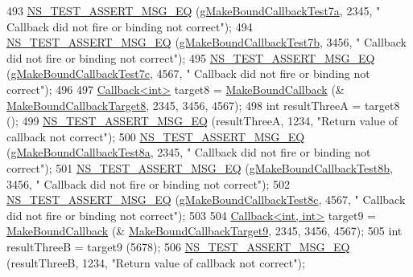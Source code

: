 \begin{DoxyCode}
493   \hyperlink{group__testing_ga2a9d78cffb3db8e867c35fff0b698cf5}{NS\_TEST\_ASSERT\_MSG\_EQ} (\hyperlink{callback-test-suite_8cc_a5e1517ba472cb373d210f6c4bf650774}{gMakeBoundCallbackTest7a}, 2345, \textcolor{stringliteral}{"
      Callback did not fire or binding not correct"});
494   \hyperlink{group__testing_ga2a9d78cffb3db8e867c35fff0b698cf5}{NS\_TEST\_ASSERT\_MSG\_EQ} (\hyperlink{callback-test-suite_8cc_a2fb964f8eaa6d045940c6b483930d1ed}{gMakeBoundCallbackTest7b}, 3456, \textcolor{stringliteral}{"
      Callback did not fire or binding not correct"});
495   \hyperlink{group__testing_ga2a9d78cffb3db8e867c35fff0b698cf5}{NS\_TEST\_ASSERT\_MSG\_EQ} (\hyperlink{callback-test-suite_8cc_a18bc2f4e64af63bb92d7ea129cee841f}{gMakeBoundCallbackTest7c}, 4567, \textcolor{stringliteral}{"
      Callback did not fire or binding not correct"});
496 
497   \hyperlink{classns3_1_1Callback}{Callback<int>} target8 = \hyperlink{group__makeboundcallback_ga1725d6362e6065faa0709f7c93f8d770}{MakeBoundCallback} (&
      \hyperlink{callback-test-suite_8cc_a3b2c793123d3f609d4e1eeee965dac5c}{MakeBoundCallbackTarget8}, 2345, 3456, 4567);
498   \textcolor{keywordtype}{int} resultThreeA = target8 ();
499   \hyperlink{group__testing_ga2a9d78cffb3db8e867c35fff0b698cf5}{NS\_TEST\_ASSERT\_MSG\_EQ} (resultThreeA, 1234, \textcolor{stringliteral}{"Return value of callback not correct"});
500   \hyperlink{group__testing_ga2a9d78cffb3db8e867c35fff0b698cf5}{NS\_TEST\_ASSERT\_MSG\_EQ} (\hyperlink{callback-test-suite_8cc_afa2dde26eb4eaba1ab619cca192e69b0}{gMakeBoundCallbackTest8a}, 2345, \textcolor{stringliteral}{"
      Callback did not fire or binding not correct"});
501   \hyperlink{group__testing_ga2a9d78cffb3db8e867c35fff0b698cf5}{NS\_TEST\_ASSERT\_MSG\_EQ} (\hyperlink{callback-test-suite_8cc_aa7b516443d299bb17a157ccff02e4f1e}{gMakeBoundCallbackTest8b}, 3456, \textcolor{stringliteral}{"
      Callback did not fire or binding not correct"});
502   \hyperlink{group__testing_ga2a9d78cffb3db8e867c35fff0b698cf5}{NS\_TEST\_ASSERT\_MSG\_EQ} (\hyperlink{callback-test-suite_8cc_ae36d0de967cac6dfce6c7cb5d82a0f34}{gMakeBoundCallbackTest8c}, 4567, \textcolor{stringliteral}{"
      Callback did not fire or binding not correct"});
503 
504   \hyperlink{classns3_1_1Callback}{Callback<int, int>} target9 = \hyperlink{group__makeboundcallback_ga1725d6362e6065faa0709f7c93f8d770}{MakeBoundCallback} (&
      \hyperlink{callback-test-suite_8cc_aac4d508c598787e6bd71ba6323d3b8f3}{MakeBoundCallbackTarget9}, 2345, 3456, 4567);
505   \textcolor{keywordtype}{int} resultThreeB = target9 (5678);
506   \hyperlink{group__testing_ga2a9d78cffb3db8e867c35fff0b698cf5}{NS\_TEST\_ASSERT\_MSG\_EQ} (resultThreeB, 1234, \textcolor{stringliteral}{"Return value of callback not correct"});

\end{DoxyCode}
